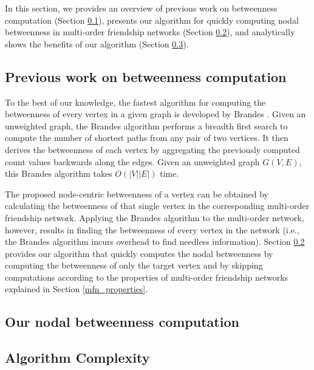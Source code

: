 In this section, we provides an overview of previous work on betweenness computation (Section \ref{sec:pre-bet}), presents our algorithm for quickly computing nodal betweenness in multi-order friendship networks (Section \ref{sec:nodal-bet}), and analytically shows the benefits of our algorithm (Section \ref{sec:complexity}).

\subsection{Previous work on betweenness computation
}\label{sec:pre-bet}

To the best of our knowledge, the fastest algorithm for computing the betweenness of every vertex in a given graph is developed by Brandes \cite{Brandes01afaster}. Given an unweighted graph, the Brandes algorithm performs a breadth first search to compute the number of shortest paths from any pair of two vertices. It then derives the betweenness of each vertex by aggregating the previously computed count values backwards along the edges. Given an unweighted graph $G(V,E)$, this Brandes algorithm takes $O(|V||E|)$ time.

The proposed node-centric betweenness of a vertex can be obtained by calculating the betweenness of that single vertex in the corresponding multi-order friendship network. Applying the Brandes algorithm to the multi-order network, however, results in finding the betweenness of every vertex in the network (i.e., the Brandes algorithm incurs overhead to find needless information). Section \ref{sec:nodal-bet} provides our algorithm that quickly computes the nodal betweenness by computing the betweenness of only the target vertex and by skipping computations according to the properties of multi-order friendship networks explained in Section \ref{mfn_properties}.


\subsection{Our nodal betweenness computation
}\label{sec:nodal-bet}

\subsection{Algorithm Complexity}\label{sec:complexity}
